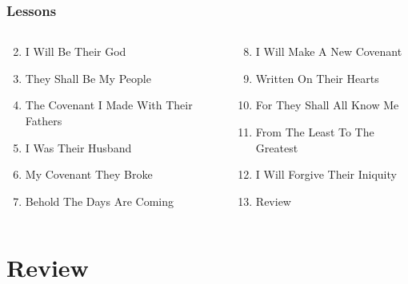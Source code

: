 \begin{frame}
\frametitle{Lessons}
\begin{columns}[T]
\begin{column}{0.5\textwidth}
\begin{enumerate}
\setcounter{enumi}{1}
\item  I Will Be Their God 
\item  They Shall Be My People 
\item  The Covenant I Made With Their Fathers 
\item  I Was Their Husband 
\item  My Covenant They Broke 
\item  Behold The Days Are Coming 
\end{enumerate}
\end{column}
\begin{column}{0.5\textwidth}
\begin{enumerate}
\setcounter{enumi}{7}
\item  I Will Make A New Covenant 

\item  Written On Their Hearts 

\item  For They Shall All Know Me 

\item  From The Least To The Greatest 

\item  I Will Forgive Their Iniquity 

\item  Review 
\end{enumerate}
\end{column}
\end{columns}
\end{frame}

\section{Review}


